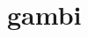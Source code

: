 \chapter{gambi}

\cite{Tanen}
\cite{RFC2544}
\cite{throughput}
\cite{Helvey}
\cite{networkTrafficTraces}

